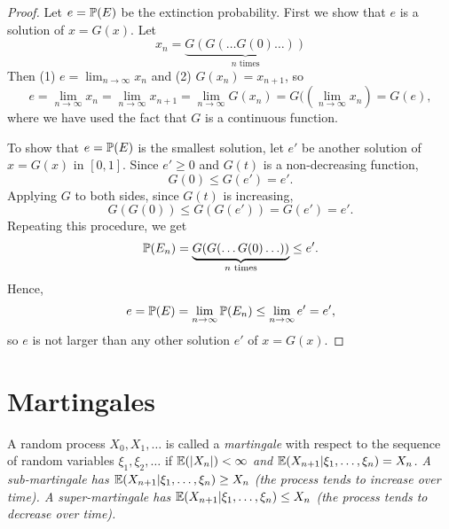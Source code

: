 \begin{proof}
Let $e=\mathbb{P}(E)$ be the extinction probability. First we show that $e$ is a solution of $x=G(x)$. Let
\[
x_n = \underbrace{G(G(\ldots G(0)\ldots))}_{\text{$n$ times}}
\]
Then (1) $e=\lim_{n\to\infty}x_n$ and (2) $G(x_n) = x_{n+1}$, so
\[
e 	= \lim_{n\to\infty}x_n 
	= \lim_{n\to\infty}x_{n+1} 
	= \lim_{n\to\infty}G(x_n) 
	= G(\left(\lim_{n\to\infty}x_n\right)
	= G(e),
\]
where we have used the fact that $G$ is a continuous function.

To show that $e=\mathbb{P}(E)$ is the smallest solution, let $e'$ be another solution of $x=G(x)$ in $[0,1]$. Since $e'\geq 0$ and $G(t)$ is a non-decreasing function,
\[
G(0) \leq G(e') = e'.
\]
Applying $G$ to both sides, since $G(t)$ is increasing,
\[
G(G(0)) \leq G(G(e')) = G(e') = e'.
\]
Repeating this procedure, we get
\[
\mathbb{P}(E_n) = \underbrace{G(G(\ldots G(0)\ldots))}_{\text{$n$ times}} \leq e'.
\]
Hence,
\[
e =\mathbb{P}(E) = \lim_{n\to\infty}\mathbb{P}(E_n) \leq \lim_{n\to\infty} e' = e',
\]
so $e$ is not larger than any other solution $e'$ of $x=G(x)$.
\end{proof}

\section{Martingales}\label{sec:martingales}
\begin{definition}
A random process $X_0,X_1,\ldots$ is called a \emph{martingale} with respect to the sequence of random variables $\xi_1,\xi_2,\ldots$ if 
\ben
\it $\mathbb{E}(|X_n|) < \infty$ and
\it $\mathbb{E}(X_{n+1}|\xi_1,\ldots,\xi_n) = X_n$.
\een
\bit
\it A \emph{sub-martingale} has $\mathbb{E}(X_{n+1}|\xi_1,\ldots,\xi_n) \geq X_n$ (the process tends to increase over time).
\it A \emph{super-martingale} has $\mathbb{E}(X_{n+1}|\xi_1,\ldots,\xi_n) \leq X_n$ (the process tends to decrease over time).
\eit
\end{definition}

